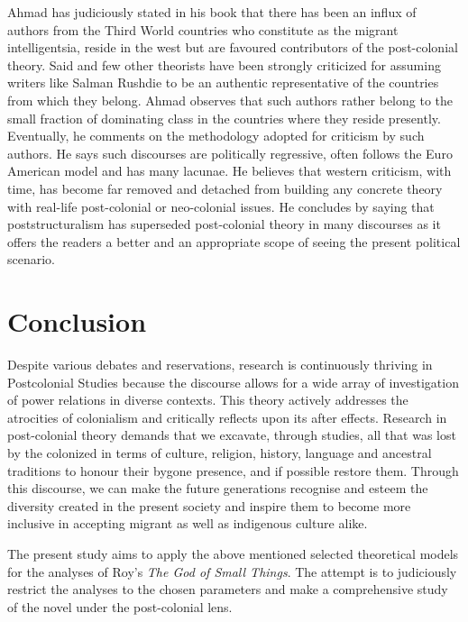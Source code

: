 Ahmad has judiciously stated in his book that there has been an influx of authors from the Third World countries who constitute as the migrant intelligentsia, reside in the west but are favoured contributors of the post-colonial theory. Said and few other theorists have been strongly criticized for assuming writers like Salman Rushdie to be an authentic representative of the countries from which they belong. Ahmad observes that such authors rather belong to the small fraction of dominating class in the countries where they reside presently. Eventually, he comments on the methodology adopted for criticism by such authors. He says such discourses are politically regressive, often follows the Euro American model and has many lacunae. He believes that western criticism, with time, has become far removed and detached from building any concrete theory with real-life post-colonial or neo-colonial issues. He concludes by saying that poststructuralism has superseded post-colonial theory in many discourses as it offers the readers a better and an appropriate scope of seeing the present political scenario.

\section{Conclusion}

Despite various debates and reservations, research is continuously thriving in Postcolonial Studies because the discourse allows for a wide array of investigation of power relations in diverse contexts. This theory actively addresses the atrocities of colonialism and critically reflects upon its after effects. Research in post-colonial theory demands that we excavate, through studies, all that was lost by the colonized in terms of culture, religion, history, language and ancestral traditions to honour their bygone presence, and if possible restore them. Through this discourse, we can make the future generations recognise and esteem the diversity created in the present society and inspire them to become more inclusive in accepting migrant as well as indigenous culture alike. 

The present study aims to apply the above mentioned selected theoretical models for the analyses of Roy’s \emph{The God of Small Things}. The attempt is to judiciously restrict the analyses to the chosen parameters and make a comprehensive study of the novel under the post-colonial lens.

